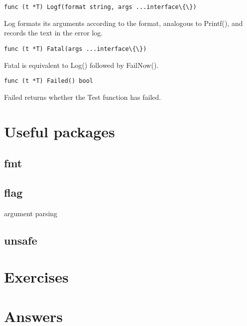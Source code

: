 \begin{lstlisting}[numbers=none]
func (t *T) Logf(format string, args ...interface\{\})
\end{lstlisting}
Log formats its arguments according to the format, analogous to Printf(),
and records the text in the error log.

\begin{lstlisting}[numbers=none]
func (t *T) Fatal(args ...interface\{\})
\end{lstlisting}
Fatal is equivalent to Log() followed by FailNow().




\begin{lstlisting}[numbers=none]
func (t *T) Failed() bool
\end{lstlisting}
Failed returns whether the Test function has failed.




\section{Useful packages}



\subsection{fmt}

\subsection{flag}
argument parsing

\subsection{unsafe}


\section{Exercises}


\cleardoublepage
\section{Answers}
\shipoutAnswer
